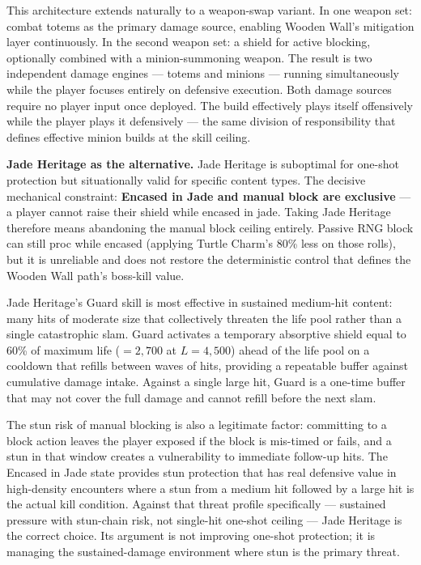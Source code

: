 \documentclass[12pt, letterpaper]{article}
\begin{document}
This architecture extends naturally to a weapon-swap variant. In one weapon set: combat totems as the primary damage source, enabling Wooden Wall's mitigation layer continuously. In the second weapon set: a shield for active blocking, optionally combined with a minion-summoning weapon. The result is two independent damage engines --- totems and minions --- running simultaneously while the player focuses entirely on defensive execution. Both damage sources require no player input once deployed. The build effectively plays itself offensively while the player plays it defensively --- the same division of responsibility that defines effective minion builds at the skill ceiling.

\textbf{Jade Heritage as the alternative.} Jade Heritage is suboptimal for one-shot protection but situationally valid for specific content types. The decisive mechanical constraint: \textbf{Encased in Jade and manual block are exclusive} --- a player cannot raise their shield while encased in jade. Taking Jade Heritage therefore means abandoning the manual block ceiling entirely. Passive RNG block can still proc while encased (applying Turtle Charm's 80\% less on those rolls), but it is unreliable and does not restore the deterministic control that defines the Wooden Wall path's boss-kill value.

Jade Heritage's Guard skill is most effective in sustained medium-hit content: many hits of moderate size that collectively threaten the life pool rather than a single catastrophic slam. Guard activates a temporary absorptive shield equal to 60\% of maximum life ($= 2{,}700$ at $L = 4{,}500$) ahead of the life pool on a cooldown that refills between waves of hits, providing a repeatable buffer against cumulative damage intake. Against a single large hit, Guard is a one-time buffer that may not cover the full damage and cannot refill before the next slam.

The stun risk of manual blocking is also a legitimate factor: committing to a block action leaves the player exposed if the block is mis-timed or fails, and a stun in that window creates a vulnerability to immediate follow-up hits. The Encased in Jade state provides stun protection that has real defensive value in high-density encounters where a stun from a medium hit followed by a large hit is the actual kill condition. Against that threat profile specifically --- sustained pressure with stun-chain risk, not single-hit one-shot ceiling --- Jade Heritage is the correct choice. Its argument is not improving one-shot protection; it is managing the sustained-damage environment where stun is the primary threat.
\end{document}
